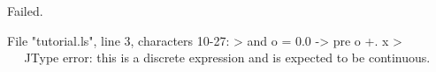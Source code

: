 \runverbatimfalse
{}
\begin{RunVerbatimMsg}
Failed.
\end{RunVerbatimMsg}
\begin{RunVerbatimErr}
File "tutorial.ls", line 3, characters 10-27:
>  and o = 0.0 -> pre o +. x
>          ^^^^^^^^^^^^^^^^^
Type error: this is a discrete expression and is expected to be continuous.
\end{RunVerbatimErr}

